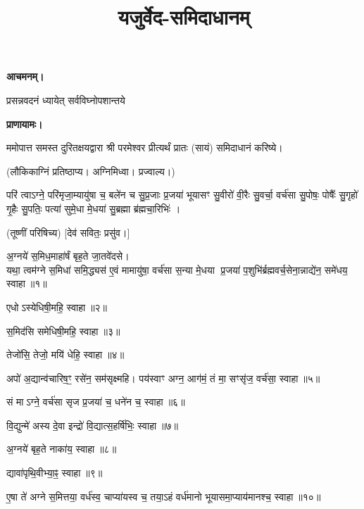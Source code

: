 \setmainfont[Script=Devanagari,Mapping=tex-text,Mapping=devanagarinumerals,AutoFakeBold=2.0]{Siddhanta}
\title{\Huge यजुर्वेद-समिदाधानम्}
\date{}
\maketitle
\tableofcontents 

\clearpage
{}

\textbf{आचमनम्।}

{प्रसन्नवदनं ध्यायेत् सर्वविघ्नोपशान्तये}
 
\textbf{प्राणायामः।} 

ममोपात्त समस्त दुरितक्षयद्वारा श्री परमेश्वर प्रीत्यर्थं प्रातः (सायं) समिदाधानं करिष्ये।

(लौकिकाग्निं प्रतिष्ठाप्य। अग्निमिध्वा। प्रज्वाल्य।)

परि॑ त्वाऽग्ने॒ परि॑मृजा॒म्यायु॑षा च॒ बले॑न च सु॒प्र॒जाः प्र॒जया॑ भूयासꣳ सु॒वीरो॑ वी॒रैः सु॒वर्चा॒ वर्च॑सा सु॒पोषः॒ पोषैः᳚ सु॒गृहो॑ गृ॒हैः सु॒पतिः॒ पत्या॑ सुमे॒धा मे॒धया॑ सु॒ब्रह्मा ब्र॑ह्मचा॒रिभिः॑ ।

(तूष्णीं परिषिच्य) [देव॑ सवितः॒ प्रसु॑व।]

अ॒ग्नये॑ स॒मिध॒माहा॑र्\mbox{}षं बृह॒ते जा॒तवे॑दसे।\\
यथा॒ त्वम॑ग्ने स॒मिधा॑ समि॒द्ध्यस॑ ए॒वं मामायु॑षा॒ वर्च॑सा स॒न्या मे॒धया प्र॒जया॑ प॒शुभि॑र्ब्रह्मवर्च॒सेना॒न्नाद्ये॑न॒ समे॑धय॒ स्वाहा॥१॥

एधोऽस्येधिषी॒महि॒ स्वाहा॥२॥

स॒मिद॑सि समेधिषी॒महि॒ स्वाहा॥३॥

तेजो॑सि॒ तेजो॒ मयि॑ धेहि॒ स्वाहा॥४॥

अपो॑ अ॒द्यान्व॑चारिष॒ꣳ॒ रसे॑न॒ सम॑सृक्ष्महि। पय॑स्वाꣳ अग्न॒ आग॑मं॒ तं मा॒ सꣳसृ॑ज॒ वर्च॑सा॒ स्वाहा॥५॥

सं माऽग्ने॒ वर्च॑सा सृज प्र॒जया॑ च॒ धने॑न च॒ स्वाहा॥६॥

वि॒द्युन्मे॑ अस्य दे॒वा इन्द्रो॑ वि॒द्यात्स॒हर्\mbox{}षि॑भिः॒ स्वाहा॥७॥

अ॒ग्नये॑ बृह॒ते नाका॑य॒ स्वाहा॥८॥

द्यावा॑पृथि॒वीभ्या॒ꣴ॒ स्वाहा॥९॥

ए॒षा ते॑ अग्ने स॒मित्तया॒ वर्ध॑स्व॒ चाप्या॑यस्व च॒ तया॒ऽहं वर्ध॑मानो भूयासमा॒प्याय॑मानश्च॒ स्वाहा॥१०॥

